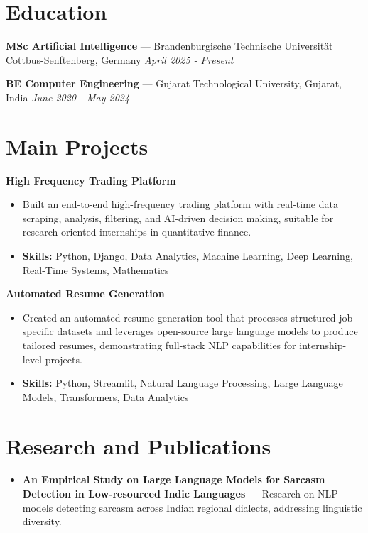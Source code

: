 \documentclass[a4paper,10pt]{article}
\begin{document}
\section*{Education}
\textbf{MSc Artificial Intelligence} — Brandenburgische Technische Universität Cottbus-Senftenberg, Germany \hfill \textit{April 2025 - Present}\par
\vspace{1.5pt}
\textbf{BE Computer Engineering} — Gujarat Technological University, Gujarat, India \hfill \textit{June 2020 - May 2024}\par

\section*{Main Projects}
\textbf{High Frequency Trading Platform}\par
\vspace{1pt}
\begin{itemize}
  \item Built an end-to-end high-frequency trading platform with real-time data scraping, analysis, filtering, and AI-driven decision making, suitable for research-oriented internships in quantitative finance.
  \item \textbf{Skills:} Python, Django, Data Analytics, Machine Learning, Deep Learning, Real-Time Systems, Mathematics
\end{itemize}
\vspace{3pt}
\textbf{Automated Resume Generation}\par
\vspace{1pt}
\begin{itemize}
  \item Created an automated resume generation tool that processes structured job-specific datasets and leverages open-source large language models to produce tailored resumes, demonstrating full-stack NLP capabilities for internship-level projects.
  \item \textbf{Skills:} Python, Streamlit, Natural Language Processing, Large Language Models, Transformers, Data Analytics
\end{itemize}

\section*{Research and Publications}
\begin{itemize}
\item \textbf{An Empirical Study on Large Language Models for Sarcasm Detection in Low-resourced Indic Languages} — Research on NLP models detecting sarcasm across Indian regional dialects, addressing linguistic diversity.
\end{itemize}
\end{document}
